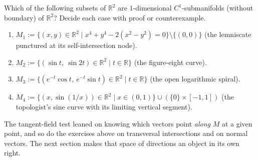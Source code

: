 \begin{exercise}
\label{ex:identifying_one_submanifolds_in_plane}
Which of the following subsets of $\mathbb{R}^2$ are $1$-dimensional $C^1$-submanifolds (without boundary) of $\mathbb{R}^2$? Decide each case with proof or counterexample.
\begin{enumerate}[label=\textbf{(\alph*)}]
  \item $M_1 := \big\{(x,y) \in \mathbb{R}^2 \;\big|\; x^4 + y^4 - 2(x^2 - y^2) = 0\big\} \setminus \{(0,0)\}$ (the lemniscate punctured at its self-intersection node).
  \item $M_2 := \big\{(\sin t,\ \sin 2t) \in \mathbb{R}^2 \;\big|\; t \in \mathbb{R}\big\}$ (the figure-eight curve).
  \item $M_3 := \big\{(e^{-t}\cos t,\ e^{-t}\sin t) \in \mathbb{R}^2 \;\big|\; t \in \mathbb{R}\big\}$ (the open logarithmic spiral).
  \item $M_4 := \big\{(x, \sin(1/x)) \in \mathbb{R}^2 \;\big|\; x \in (0, 1)\big\} \cup (\{0\} \times [-1, 1])$ (the topologist's sine curve with its limiting vertical segment).
\end{enumerate}
\end{exercise}

The tangent-field test leaned on knowing which vectors point \emph{along} $M$ at a given point,
and so do the exercises above on transversal intersections and on normal vectors. The next
section makes that space of directions an object in its own right.
